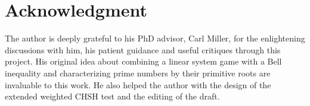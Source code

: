 \documentclass[11pt,letterpaper]{article}
\newcommand{\ket}[1]{|#1\rangle}
\newcommand{\ketbra}[2]{|#1\rangle\langle#2|}
\DeclareMathOperator{\Tr}{Tr}
\DeclareMathOperator{\supp}{supp}
\newcommand{\1}{\mathbb{1}}
\newcommand{\Pg}{\mathcal{P}}
\newcommand{\CHSH}{CHSH^{(d)}}
\newcommand{\tA}{\tilde{A}}
\newcommand{\tU}{\tilde{U}}
\theoremstyle{definition}
\begin{document}


\section*{Acknowledgment}
The author is deeply grateful to his PhD advisor, Carl Miller, for the enlightening discussions with him, his patient guidance and useful critiques through this
project. His original idea about 
combining a linear system game with a Bell inequality and characterizing prime numbers
by their primitive roots are invaluable to
this work. He also helped the author with the design
of the extended weighted CHSH test
and the editing of the draft.



\appendix

\end{document}
